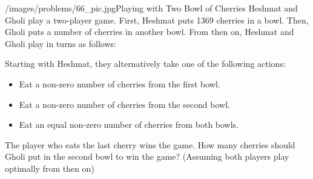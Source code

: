 \begin{problem}{/images/problems/66_pic.jpg}{Playing with Two Bowl of Cherries} Heshmat and Gholi play a two-player game. First, Heshmat puts 1369 cherries in a bowl. Then, Gholi puts a number of cherries in another bowl. From then on, Heshmat and Gholi play in turns as follows:
	
	Starting with Heshmat, they alternatively take one of the following actions:
	\begin{itemize}
	\item Eat a non-zero number of cherries from the first bowl.
	\item Eat a non-zero number of cherries from the second bowl.
	\item Eat an equal non-zero number of cherries from both bowls.
	\end{itemize}
	The player who eats the last cherry wins the game. How many cherries should Gholi put in the second bowl to win the game? (Assuming both players play optimally from then on)
\end{problem}

